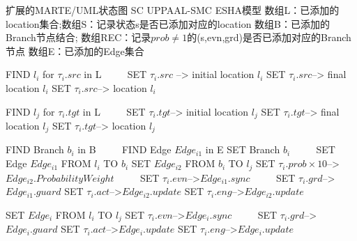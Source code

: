 	\begin{algorithmic}[1]
	\label{trans}
	 \small
		\REQUIRE 扩展的MARTE/UML状态图 SC
		\ENSURE UPPAAL-SMC ESHA模型
		\STATE 数组L：已添加的location集合;数组S：记录状态s是否已添加对应的location 
		\STATE 数组B：已添加的Branch节点结合;
		\STATE 数组REC：记录$prob\not=1$的(s,evn,grd)是否已添加对应的Branch节点
		\STATE 数组E：已添加的Edge集合
		
		 
		\STATE FIND $l_{i}$ for $\tau_{i}.src$ in L ~~~~
   		\STATE SET $\tau_{i}.src$ --> initial location $l_{i}$
   		\STATE SET $\tau_{i}.src$--> final location $l_{i}$
		\ELSE 
   		\STATE SET $\tau_{i}.src$--> location $l_{i}$
		\ENDIF

		\STATE FIND $l_{j}$ for $\tau_{i}.tgt$ in L  ~~~~
   		\STATE SET $\tau_{i}.tgt$--> initial location $l_{j}$
   		\STATE SET $\tau_{i}.tgt$--> final location $l_{j}$
		\ELSE 
   		\STATE SET $\tau_{i}.tgt$--> location $l_{j}$
		\ENDIF

			\STATE FIND Branch $b_{i}$ in B  ~~~~
			\STATE FIND Edge $Edge_{i1}$ in E
		\ELSE
			\STATE SET Branch $b_{i}$ ~~~~
			\STATE SET Edge $Edge_{i1}$ FROM $l_{i}$ TO $b_{i}$
		\ENDIF
		\STATE SET $Edge_{i2}$ FROM $b_{i}$ TO $l_{j}$ 
		\STATE SET $\tau_{i}.prob \times 10$-->$Edge_{i2}.Probability Weight$ ~~~~
		\STATE SET $\tau_{i}.evn$-->$Edge_{i1}.sync$ ~~~~
		\STATE SET $\tau_{i}.grd$-->$Edge_{i1}.guard$
		\STATE SET $\tau_{i}.act$-->$Edge_{i2}.update$
		\STATE SET $\tau_{i}.eng$-->$Edge_{i2}.update$
		
		\ELSE		
		\STATE SET $Edge_{i}$ FROM $l_{i}$ TO $l_{j}$
		\STATE SET $\tau_{i}.evn$-->$Edge_{i}.sync$ ~~~~
		\STATE SET $\tau_{i}.grd$-->$Edge_{i}.guard$
		\STATE SET $\tau_{i}.act$-->$Edge_{i}.update$
		\STATE SET $\tau_{i}.eng$-->$Edge_{i}.update$
		\ENDIF


\end{algorithmic}
